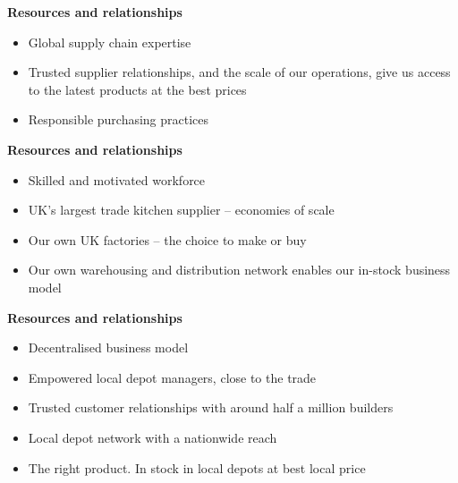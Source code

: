 \documentclass{article}
\begin{document}
\noindent
\begin{minipage}[t]{0.32\textwidth}
\begin{tcolorbox}[colback=RedViolet, colframe=RedViolet,
  coltitle=white, coltext=white,
fonttitle=\bfseries\Large,
  top=5pt, bottom=5pt, left=5pt, right=5pt,
  title=Global sourcing, halign=center, height=0.42\textheight, valign=top]
\textbf{Resources and relationships}
\begin{itemize}[leftmargin=*, label=\textbullet, itemsep=4pt]
  \item Global supply chain expertise
  \item Trusted supplier relationships, and the scale of our operations, give us access to the latest products at the best prices
  \item Responsible purchasing practices
\end{itemize}
\end{tcolorbox}
\end{minipage}\hfill
%
\begin{minipage}[t]{0.32\textwidth}
\begin{tcolorbox}[colback=MidnightBlue, colframe=MidnightBlue,
  coltitle=white, coltext=white,
fonttitle=\bfseries\Large,
  top=5pt, bottom=5pt, left=5pt, right=5pt,
  title=UK manufacturing \& distribution, halign=center, height=0.42\textheight, valign=top]
\textbf{Resources and relationships}
\begin{itemize}[leftmargin=*, label=\textbullet, itemsep=4pt]
  \item Skilled and motivated workforce
  \item UK's largest trade kitchen supplier – economies of scale
  \item Our own UK factories – the choice to make or buy
  \item Our own warehousing and distribution network enables our in-stock business model
\end{itemize}
\end{tcolorbox}
\end{minipage}\hfill
%
\begin{minipage}[t]{0.32\textwidth}
\begin{tcolorbox}[colback=teal!80!black, colframe=teal!80!black,
  coltitle=white, coltext=white,
fonttitle=\bfseries\Large,
  top=5pt, bottom=5pt, left=5pt, right=5pt,
  title=Nationwide depot network, halign=center, height=0.42\textheight, valign=top]
\textbf{Resources and relationships}
\begin{itemize}[leftmargin=*, label=\textbullet, itemsep=4pt]
  \item Decentralised business model
  \item Empowered local depot managers, close to the trade
  \item Trusted customer relationships with around half a million builders
  \item Local depot network with a nationwide reach
  \item The right product. In stock in local depots at best local price
\end{itemize}
\end{tcolorbox}
\end{minipage}
\end{document}
